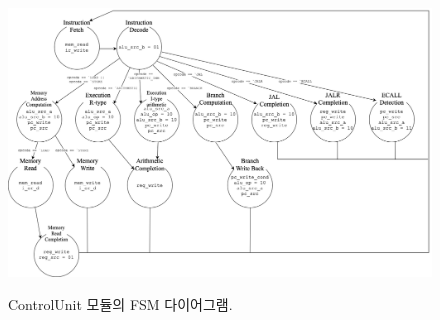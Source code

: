 \documentclass[openright, a4paper]{article}
\begin{document}
{
    \begin{figure}[!h]
        \centering
        \includegraphics[width=\textwidth]{multicycle-fsm.png}
        \label{fig:design}
        \caption{ControlUnit 모듈의 FSM 다이어그램.}
    \end{figure}
}
\end{document}
